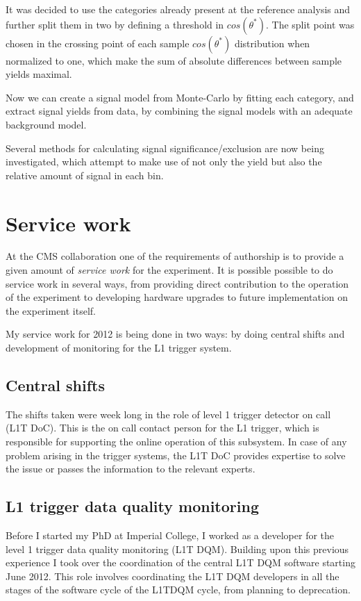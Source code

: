 \documentclass[%
reprint,
amsmath,
amssymb,
aps,
pra,
showkeys
]{revtex4-1}
\begin{document}
It was decided to use the categories already present at the reference analysis and further split them in two by 
defining a threshold in $cos(\theta^{*})$. The split point was chosen in the crossing point of each sample 
$cos(\theta^{*})$ distribution when normalized to one, which make the sum of absolute differences between sample 
yields maximal.

Now we can create a signal model from Monte-Carlo by fitting each category, and extract signal yields from data, 
by combining the signal models with an adequate background model.

Several methods for calculating signal significance/exclusion are now being investigated, which attempt to make use 
of not only the yield but also the relative amount of signal in each bin.

\section{Service work}

At the CMS collaboration one of the requirements of authorship is to provide a given amount of \textit{service work}
for the experiment.
It is possible possible to do service work in several ways, from providing direct contribution to the operation of
the experiment to developing hardware upgrades to future implementation on the experiment itself.

My service work for 2012 is being done in two ways: by doing central shifts and development of monitoring for the
L1 trigger system.

\subsection{Central shifts}

The shifts taken were week long in the role of level 1 trigger detector on call (L1T DoC). This is the on call contact
person for the L1 trigger, which is responsible for supporting the online operation of this subsystem. In case of
any problem arising in the trigger systems, the L1T DoC provides expertise to solve the issue or passes the information
to the relevant experts.

\subsection{L1 trigger data quality monitoring}

Before I started my PhD at Imperial College, I worked as a developer for the level 1 trigger data quality monitoring
(L1T DQM). Building upon this previous experience I took over the coordination of the central L1T DQM software starting
June 2012. This role involves coordinating the L1T DQM developers in all the stages of the software cycle of the L1TDQM
cycle, from planning to deprecation.
\end{document}
